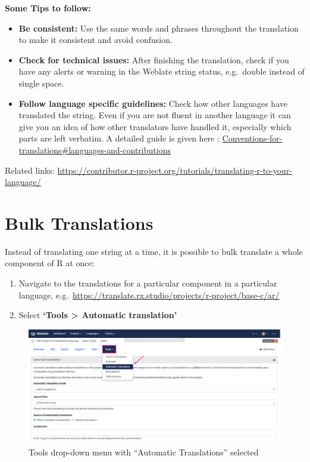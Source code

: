 \documentclass[
]{book}
\begin{document}
\textbf{Some Tips to follow:}

\begin{itemize}
\item
  \textbf{Be consistent:} Use the same words and phrases throughout the
  translation to make it consistent and avoid confusion.
\item
  \textbf{Check for technical issues:} After finishing the translation,
  check if you have any alerts or warning in the Weblate string
  status, e.g.~double instead of single space.
\item
  \textbf{Follow language specific guidelines:} Check how other languages
  have translated the string. Even if you are not fluent in another
  language it can give you an idea of how other translators have
  handled it, especially which parts are left verbatim. A detailed
  guide is given here :
  \href{https://contributor.r-project.org/translations/Conventions_for_Languages/\#languages-and-contributions}{Conventions-for-translations\#languages-and-contributions}
\end{itemize}

Related links:
\url{https://contributor.r-project.org/tutorials/translating-r-to-your-language/}

\section{Bulk Translations}\label{bulk-translations}

Instead of translating one string at a time, it is possible to bulk translate a whole component of R at once:

\begin{enumerate}
\def\labelenumi{\arabic{enumi}.}
\item
  Navigate to the translations for a particular component in a particular language, e.g.~\url{https://translate.rx.studio/projects/r-project/base-c/ar/}
\item
  Select \textbf{`Tools \textgreater{} Automatic translation'}
\end{enumerate}

\begin{figure}
\centering
\includegraphics{img/translate_automatic_translation.png}
\caption{Tools drop-down menu with ``Automatic Translations'' selected}
\end{figure}
\end{document}
